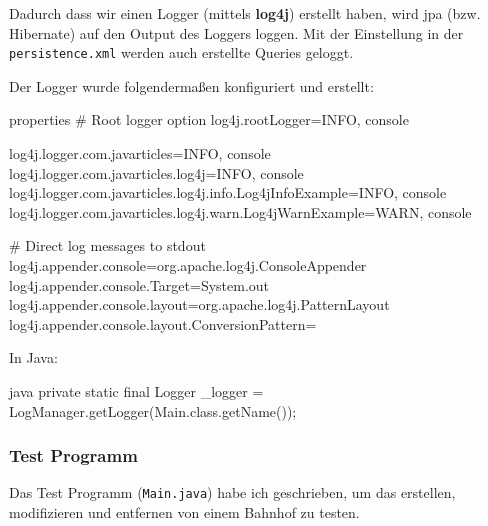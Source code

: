 Dadurch dass wir einen Logger (mittels \textbf{log4j}) erstellt haben, wird \gls{jpa} (bzw. Hibernate) auf den Output des Loggers loggen. Mit der Einstellung in der \texttt{persistence.xml} werden auch erstellte Queries geloggt.

Der Logger wurde folgendermaßen konfiguriert und erstellt:

\begin{code}{properties}
# Root logger option
log4j.rootLogger=INFO, console

log4j.logger.com.javarticles=INFO, console
log4j.logger.com.javarticles.log4j=INFO, console
log4j.logger.com.javarticles.log4j.info.Log4jInfoExample=INFO, console
log4j.logger.com.javarticles.log4j.warn.Log4jWarnExample=WARN, console

# Direct log messages to stdout
log4j.appender.console=org.apache.log4j.ConsoleAppender
log4j.appender.console.Target=System.out
log4j.appender.console.layout=org.apache.log4j.PatternLayout
log4j.appender.console.layout.ConversionPattern=%
\end{code}

In Java:

\begin{code}{java}
private static final Logger _logger = LogManager.getLogger(Main.class.getName());
\end{code}

\subsubsection{Test Programm}

Das Test Programm (\texttt{Main.java}) habe ich geschrieben, um das erstellen, modifizieren und entfernen von einem Bahnhof zu testen.

